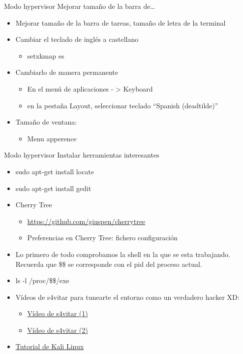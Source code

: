 \documentclass[aspectratio=169,11pt]{beamer}
\begin{document}
\begin{frame}[allowframebreaks]{Modo hypervisor}
\small
Mejorar tamaño de la barra de\dots{}
  \begin{itemize}
  \item Mejorar tamaño de la barra de tareas, tamaño de letra de la terminal
  \item Cambiar el teclado de inglés a castellano
    \begin{itemize}
    \item setxkmap es
    \end{itemize}
  \item Cambiarlo de manera permanente
    \begin{itemize}
    \item En el menú de aplicaciones - > Keyboard
    \item en la pestaña Layout, seleccionar teclado ``Spanish (deadtilde)''
    \end{itemize}
  \item Tamaño de ventana:
    \begin{itemize}
    \item Menu apperence
    \end{itemize}
  \end{itemize}
\end{frame}

\begin{frame}[allowframebreaks]{Modo hypervisor}
\small
Instalar herramientas interesantes
  \begin{itemize}
  \item sudo apt-get install locate
  \item sudo apt-get install gedit

  \item Cherry Tree
    \begin{itemize}
    \item \href{https://github.com/giuspen/cherrytree}{https://github.com/giuspen/cherrytree}
    \item Preferencias en Cherry Tree: fichero configuración
    \end{itemize}
  \item Lo primero de todo comprobamos la shell en la que se esta trabajando. Recuerda que \$\$ se corresponde con el pid del proceso actual.
  \item ls -l /proc/\$\$/exe
  \item Vídeos de s4vitar para tunearte el entorno como un verdadero hacker XD:
    \begin{itemize}
    \item \href{https://www.youtube.com/watch?v=mHLwfI1nHHY}{Vídeo de s4vitar (1)}
    \item \href{https://www.youtube.com/watch?v=fshLf6u8B-w&t=5279s}{Vídeo de s4vitar (2)}
    \end{itemize}
  \item \href{https://www.youtube.com/watch?v=U1w4T03B30I}{Tutorial de Kali Linux}
  \end{itemize}
\end{frame}
\end{document}

